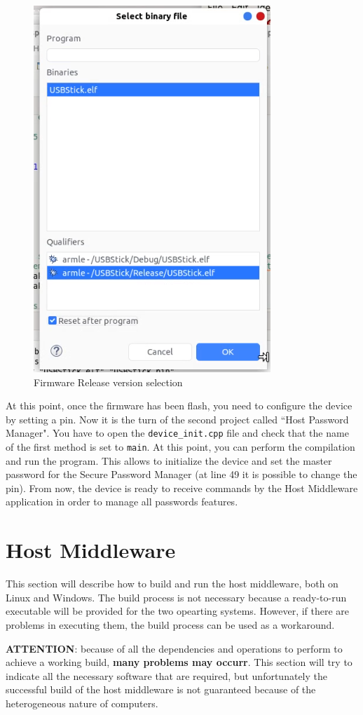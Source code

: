 \begin{figure}[H]
	\centering
	\includegraphics[width=0.3\linewidth]{images/firmware/setup_12}
	\caption{Firmware Release version selection}
	\label{fig:setup12}
\end{figure}

At this point, once the firmware has been flash, you need to configure the device by setting a pin. Now it is the turn of the second project called ``Host Password Manager".\newline\newline
You have to open the \texttt{device\_init.cpp} file and check that the name of the first method is set to \texttt{main}. At this point, you can perform the compilation and run the program. This allows to initialize the device and set the master password for the Secure Password Manager (at line 49 it is possible to change the pin). From now, the device is ready to receive commands by the Host Middleware application in order to manage all passwords features.

\section{Host Middleware}

This section will describe how to build and run the host middleware, both on Linux and Windows. The build process is not necessary because a ready-to-run executable will be provided for the two opearting systems. However, if there are problems in executing them, the build process can be used as a workaround.

\begin{warning}
\textbf{ATTENTION}: because of all the dependencies and operations to perform to achieve a working build, \textbf{many problems may occurr}. This section will try to indicate all the necessary software that are required, but unfortunately the successful build of the host middleware is not guaranteed because of the heterogeneous nature of computers.
\end{warning}

